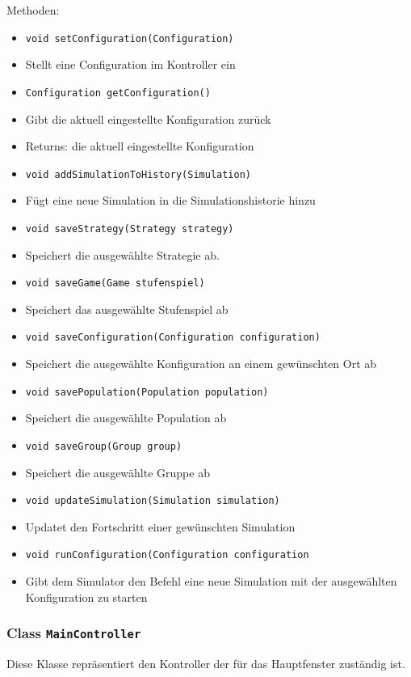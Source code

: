 \documentclass[parskip=full,11pt]{scrartcl}
\begin{document}
Methoden:
\begin{itemize}\itemsep -10pt
\item \texttt{void setConfiguration(Configuration)}
\item[] Stellt eine Configuration im Kontroller ein


\item \texttt{Configuration getConfiguration()}
\item[] Gibt die aktuell eingestellte Konfiguration zurück
\item[] Returns: die aktuell eingestellte Konfiguration

\item \texttt{void addSimulationToHistory(Simulation)}
\item[] Fügt eine neue Simulation in die Simulationshistorie hinzu

\item \texttt{void saveStrategy(Strategy strategy)}
\item[] Speichert die ausgewählte Strategie ab.

\item\texttt{void saveGame(Game stufenspiel)}
\item[] Speichert das ausgewählte Stufenspiel ab

\item \texttt{void saveConfiguration(Configuration configuration)}
\item[] Speichert die ausgewählte Konfiguration an einem gewünschten Ort ab

\item \texttt{void savePopulation(Population population)}
\item[] Speichert die ausgewählte Population ab

\item \texttt{void saveGroup(Group group)}
\item[] Speichert die ausgewählte Gruppe ab

\item \texttt{void updateSimulation(Simulation simulation)}
\item[] Updatet den Fortschritt einer gewünschten Simulation

\item \texttt{void runConfiguration(Configuration configuration}
\item[] Gibt dem Simulator den Befehl eine neue Simulation mit der ausgewählten Konfiguration zu starten
\end{itemize}

\subsubsection{Class \texttt{MainController}}
Diese Klasse repräsentiert den Kontroller der für das Hauptfenster zuständig ist.
\end{document}
